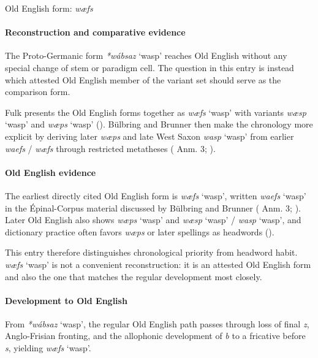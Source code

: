 \documentclass[
  british,
  a4paper,
]{article}
\providecommand{\Recon}[1]{\emph{*#1}}
\begin{document}
Old English form: \emph{wæfs}

\paragraph{Reconstruction and comparative
evidence}\label{reconstruction-and-comparative-evidence-81}

The Proto-Germanic form \Recon{wábsaz} `wasp' reaches Old English
without any special change of stem or paradigm cell. The question in
this entry is instead which attested Old English member of the variant
set should serve as the comparison form.

Fulk presents the Old English forms together as {\emph{wæfs}} `wasp'
with variants {\emph{wæsp}} `wasp' and {\emph{wæps}} `wasp'
(). Bülbring and Brunner
then make the chronology more explicit by deriving later \emph{wæps} and
late West Saxon {\emph{wasp}} `wasp' from earlier \emph{waefs} /
\emph{wæfs} through restricted metatheses
( Anm. 3;
).

\paragraph{Old English evidence}\label{old-english-evidence-81}

The earliest directly cited Old English form is {\emph{wæfs}} `wasp',
written {\emph{waefs}} `wasp' in the Épinal-Corpus material discussed by
Bülbring and Brunner ( Anm. 3; ). Later Old English also shows {\emph{wæps}} `wasp' and
{\emph{wæsp}} `wasp' / {\emph{wasp}} `wasp', and dictionary practice
often favors {\emph{wæps}} or later spellings as headwords
().

This entry therefore distinguishes chronological priority from headword
habit. {\emph{wæfs}} `wasp' is not a convenient reconstruction: it is an
attested Old English form and also the one that matches the regular
development most closely.

\paragraph{Development to Old
English}\label{development-to-old-english-81}

From \Recon{wábsaz} `wasp', the regular Old English path passes through
loss of final \emph{z}, Anglo-Frisian fronting, and the allophonic
development of \emph{b} to a fricative before \emph{s}, yielding
{\emph{wæfs}} `wasp'.
\end{document}
